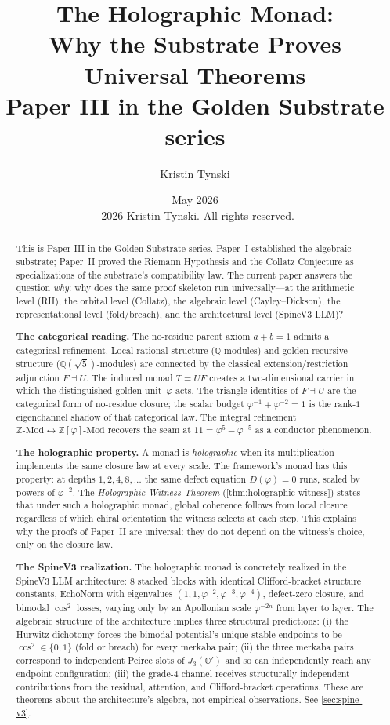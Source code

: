 \documentclass[11pt,a4paper]{article}
\title{The Holographic Monad:\\
Why the Substrate Proves Universal Theorems\\[4pt]
{\large Paper III in the Golden Substrate series}}
\author{Kristin Tynski}
\date{May 2026 \\[6pt] {\small\textcopyright\ 2026 Kristin Tynski. All rights reserved.}}
\theoremstyle{plain}
\theoremstyle{definition}
\theoremstyle{remark}
\numberwithin{equation}{section}
\providecommand{\Z}{\mathbb{Z}}
\providecommand{\Q}{\mathbb{Q}}
\providecommand{\Os}{\mathbb{O}'}
\providecommand{\vp}{\varphi}
\begin{document}
\maketitle

\begin{abstract}
\noindent
This is Paper III in the Golden Substrate series.  Paper~I established
the algebraic substrate; Paper~II proved the Riemann Hypothesis
and the Collatz Conjecture as specializations of the substrate's
compatibility law.  The current paper answers the question
\emph{why}: why does the same proof skeleton run universally---at
the arithmetic level (RH), the orbital level (Collatz), the
algebraic level (Cayley--Dickson), the representational level
(fold/breach), and the architectural level (SpineV3 LLM)?

\medskip\noindent\textbf{The categorical reading.}
The no-residue parent axiom $a + b = 1$ admits a categorical
refinement.  Local rational structure ($\Q$-modules) and golden
recursive structure ($\Q(\sqrt{5})$-modules) are connected by the
classical extension/restriction adjunction $F \dashv U$.  The
induced monad $T = UF$ creates a two-dimensional carrier in which
the distinguished golden unit~$\vp$ acts.  The triangle identities
of $F \dashv U$ are the categorical form of no-residue closure;
the scalar budget $\vp^{-1} + \vp^{-2} = 1$ is the rank-$1$
eigenchannel shadow of that categorical law.  The integral
refinement $\Z\text{-Mod} \leftrightarrow \Z[\vp]\text{-Mod}$
recovers the seam at $11 = \vp^5 - \vp^{-5}$ as a conductor
phenomenon.

\medskip\noindent\textbf{The holographic property.}
A monad is \emph{holographic} when its multiplication implements
the same closure law at every scale.  The framework's monad has
this property: at depths $1, 2, 4, 8, \ldots$ the same defect
equation $D(\vp) = 0$ runs, scaled by powers of $\vp^{-2}$.  The
\emph{Holographic Witness Theorem} (\cref{thm:holographic-witness})
states that under such a holographic monad, global coherence
follows from local closure regardless of which chiral orientation
the witness selects at each step.  This explains why the proofs of
Paper~II are universal: they do not depend on the witness's
choice, only on the closure law.

\medskip\noindent\textbf{The SpineV3 realization.}
The holographic monad is concretely realized in the SpineV3 LLM
architecture: $8$ stacked blocks with identical Clifford-bracket
structure constants, EchoNorm with eigenvalues
$(1, 1, \vp^{-2}, \vp^{-3}, \vp^{-4})$, defect-zero closure, and
bimodal $\cos^2$ losses, varying only by an Apollonian scale
$\vp^{-2n}$ from layer to layer.  The algebraic structure of the
architecture implies three structural predictions: (i) the Hurwitz
dichotomy forces the bimodal potential's unique stable endpoints to
be $\cos^2 \in \{0, 1\}$ (fold or breach) for every merkaba pair;
(ii) the three merkaba pairs correspond to independent Peirce slots
of $J_3(\Os)$ and so can independently reach any endpoint
configuration; (iii) the grade-$4$ channel receives
structurally independent contributions from the residual, attention,
and Clifford-bracket operations.  These are theorems about the
architecture's algebra, not empirical observations.
See \cref{sec:spine-v3}.


\end{abstract}
\end{document}
